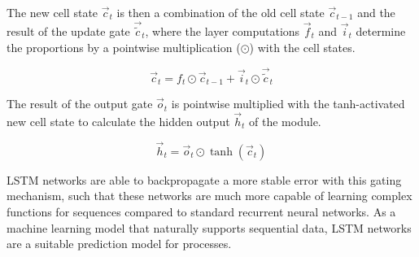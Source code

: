 The new cell state $\vec{c}_t$ is then a combination of the old cell state $\vec{c}_{t-1}$ and the result of the update gate $\vec{\tilde{c}}_t$, where the layer computations $\vec{f}_t$ and $\vec{i}_t$ determine the proportions by a pointwise multiplication ($\odot$) with the cell states.

\begin{equation*}
	\vec{c}_t = f_t \odot \vec{c}_{t-1} + \vec{i}_t \odot \vec{\tilde{c}}_t
\end{equation*}

The result of the output gate $\vec{o}_t$ is pointwise multiplied with the tanh-activated new cell state to calculate the hidden output $\vec{h}_t$ of the module.

\begin{equation*}
	\vec{h}_t = \vec{o}_t \odot \tanh(\vec{c}_t )
\end{equation*}

LSTM networks are able to backpropagate a more stable error with this gating mechanism, such that these networks are much more capable of learning complex functions for sequences compared to standard recurrent neural networks.
As a machine learning model that naturally supports sequential data, LSTM networks are a suitable prediction model for processes.